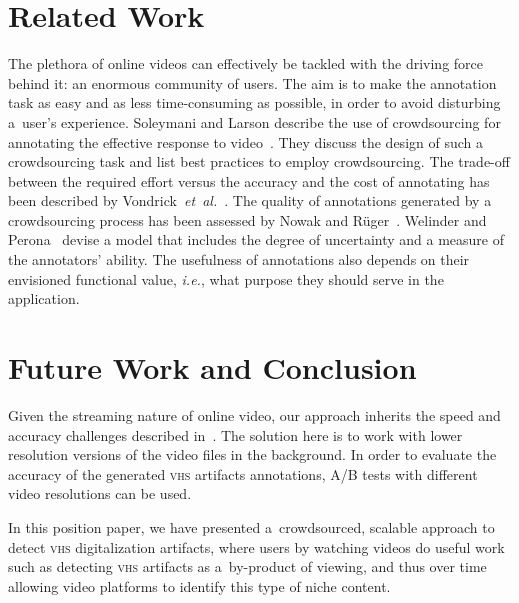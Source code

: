 \documentclass{sig-alternate}
\begin{document}
\section{Related Work}

The plethora of online videos can effectively be tackled
with the driving force behind it: an enormous community of users.
The aim is to make the annotation task as easy
and as less time-consuming as possible,
in order to avoid disturbing a~user's experience.
Soleymani and Larson describe the use of crowdsourcing
for annotating the effective response to video~\cite{Soleymani:2010}.
They discuss the design of such a crowdsourcing task
and list best practices to employ crowdsourcing.
The trade-off between the required effort versus the accuracy
and the cost of annotating has been described
by Vondrick~\emph{et~al.}~\cite{Vondrick:2010}.
The quality of annotations generated by a crowdsourcing process
has been assessed by Nowak and R\"{u}ger~\cite{Nowak:2010}.
Welinder and Perona~\cite{Welinder:2010} devise a model
that includes the degree of uncertainty
and a measure of the annotators' ability.
The usefulness of annotations
also depends on their envisioned functional value, \emph{i.e.},
what purpose they should serve in the application.

\section{Future Work and Conclusion}

Given the streaming nature of online video,
our approach inherits the speed and accuracy challenges
described in~\cite{steiner_www_2012b}.
The solution here is to work with
lower resolution versions of the video files in the background.
In order to evaluate the accuracy of the generated
{\scshape vhs} artifacts annotations,
A/B tests with different video resolutions can be used.

In this position paper, we have presented a~crowdsourced,
scalable approach to detect {\scshape vhs} digitalization artifacts,
where users by watching videos do useful work such as
detecting {\scshape vhs} artifacts as a~by-product of viewing,
and thus over time allowing video platforms to identify
this type of niche content.



\end{document}
